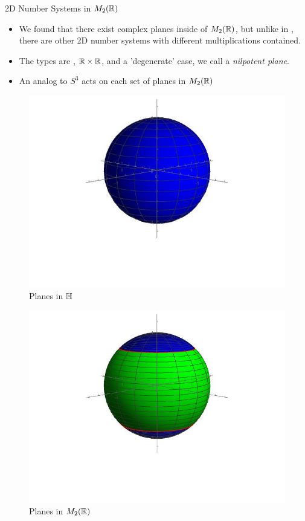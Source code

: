 \documentclass[t,slidestop,compress,mathserif,color=option,hyperref={pdfstartview={Fit},pdfpagelayout={SinglePage},pdfpagemode={UseOutlines}}]{beamer}
\begin{document}
\begin{frame}{2D Number Systems in $M_2(\protect\mathbb{R})$}
\begin{itemize}
    \item We found that there exist complex planes inside of $M_2(\protect\mathbb{R})$, but unlike in \bH, there are other 2D number systems with different multiplications contained.
    \item The types are \bC, $\protect\mathbb{R} \times \protect\mathbb{R}$, and a 'degenerate' case, we call a {\it nilpotent plane}.
    \item An analog to $S^3$ acts on each set of planes in $M_2(\protect\mathbb{R})$
\end{itemize}

\begin{minipage}{.45\textwidth}
\begin{figure}
    \centering
    \includegraphics[trim = 0 120 0 0, scale=.25]{H Pres - 8-20-20/QuatSphere.jpg}
    \caption{Planes in $\protect\mathbb{H}$}
    \label{fig:H}
\end{figure}
\end{minipage}
\begin{minipage}{.45\textwidth}
\begin{figure}
    \centering
    \includegraphics[trim = 0 150 0 0, scale=.2]{H Pres - 8-20-20/MatricesSphere.jpg}
    \caption{Planes in $M_2(\protect\mathbb{R})$}
    \label{fig:my_label}
\end{figure}
\end{minipage}    


\end{frame}
\end{document}
